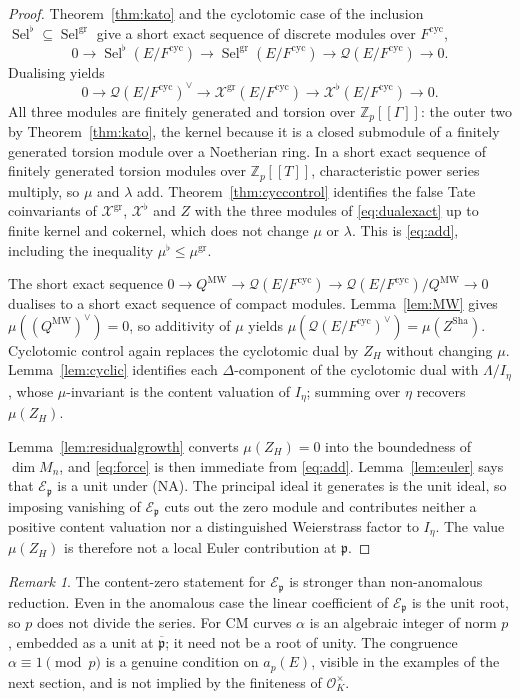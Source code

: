 \documentclass[11pt]{article}
\theoremstyle{definition}
\theoremstyle{remark}
\newtheorem{remark}[theorem]{Remark}
\newcommand{\Z}{\mathbb{Z}}
\newcommand{\Sel}{\operatorname{Sel}}
\newcommand{\Sha}{\operatorname{Sha}}
\newcommand{\cyc}{\mathrm{cyc}}
\newcommand{\gr}{\mathrm{gr}}
\newcommand{\flatp}{\flat}
\newcommand{\pp}{\mathfrak{p}}
\newcommand{\ppb}{\overline{\mathfrak{p}}}
\newcommand{\cO}{\mathcal{O}}
\newcommand{\cE}{\mathcal{E}}
\newcommand{\cX}{\mathcal{X}}
\newcommand{\cQ}{\mathcal{Q}}
\newcommand{\Lam}{\Lambda}
\begin{document}
\begin{proof}
Theorem~\ref{thm:kato} and the cyclotomic case of the inclusion \(\Sel^{\flatp}\subseteq\Sel^{\gr}\) give a short exact sequence of discrete modules over \(F^{\cyc}\),
\[
0\to
\Sel^{\flatp}(E/F^{\cyc})
\to
\Sel^{\gr}(E/F^{\cyc})
\to
\cQ(E/F^{\cyc})
\to 0.
\]
Dualising yields
\begin{equation}
\label{eq:dualexact}
0\to
\cQ(E/F^{\cyc})^\vee
\to
\cX^{\gr}(E/F^{\cyc})
\to
\cX^{\flatp}(E/F^{\cyc})
\to 0.
\end{equation}
All three modules are finitely generated and torsion over \(\Z_p[[\Gamma]]\): the outer two by Theorem~\ref{thm:kato}, the kernel because it is a closed submodule of a finitely generated torsion module over a Noetherian ring. In a short exact sequence of finitely generated torsion modules over \(\Z_p[[T]]\), characteristic power series multiply, so \(\mu\) and \(\lambda\) add. Theorem~\ref{thm:cyccontrol} identifies the false Tate coinvariants of \(\cX^{\gr}\), \(\cX^{\flatp}\) and \(Z\) with the three modules of \eqref{eq:dualexact} up to finite kernel and cokernel, which does not change \(\mu\) or \(\lambda\). This is \eqref{eq:add}, including the inequality \(\mu^{\flatp}\le\mu^{\gr}\).

The short exact sequence \(0\to Q^{\mathrm{MW}}\to\cQ(E/F^{\cyc})\to\cQ(E/F^{\cyc})/Q^{\mathrm{MW}}\to 0\) dualises to a short exact sequence of compact modules. Lemma~\ref{lem:MW} gives \(\mu((Q^{\mathrm{MW}})^\vee)=0\), so additivity of \(\mu\) yields \(\mu(\cQ(E/F^{\cyc})^\vee)=\mu(Z^{\Sha})\). Cyclotomic control again replaces the cyclotomic dual by \(Z_H\) without changing \(\mu\). Lemma~\ref{lem:cyclic} identifies each \(\Delta\)-component of the cyclotomic dual with \(\Lam/I_\eta\), whose \(\mu\)-invariant is the content valuation of \(I_\eta\); summing over \(\eta\) recovers \(\mu(Z_H)\).

Lemma~\ref{lem:residualgrowth} converts \(\mu(Z_H)=0\) into the boundedness of \(\dim M_n\), and \eqref{eq:force} is then immediate from \eqref{eq:add}. Lemma~\ref{lem:euler} says that \(\cE_{\pp}\) is a unit under (NA). The principal ideal it generates is the unit ideal, so imposing vanishing of \(\cE_{\pp}\) cuts out the zero module and contributes neither a positive content valuation nor a distinguished Weierstrass factor to \(I_\eta\). The value \(\mu(Z_H)\) is therefore not a local Euler contribution at \(\pp\).
\end{proof}

\begin{remark}
The content-zero statement for \(\cE_{\pp}\) is stronger than non-anomalous reduction. Even in the anomalous case the linear coefficient of \(\cE_{\pp}\) is the unit root, so \(p\) does not divide the series. For CM curves \(\alpha\) is an algebraic integer of norm \(p\), embedded as a unit at \(\ppb\); it need not be a root of unity. The congruence \(\alpha\equiv 1\pmod{p}\) is a genuine condition on \(a_p(E)\), visible in the examples of the next section, and is not implied by the finiteness of \(\cO_K^\times\).
\end{remark}
\end{document}

